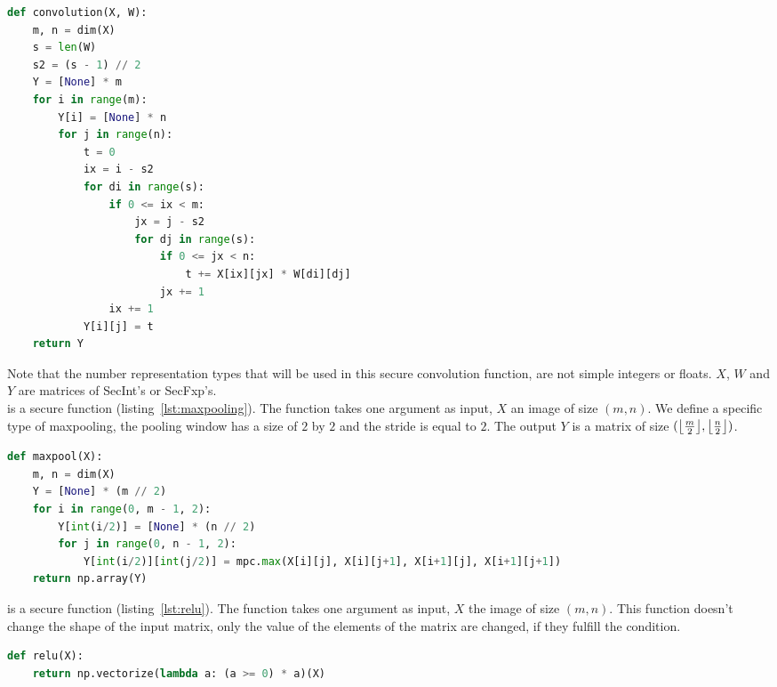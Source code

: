 \begin{lstlisting}[language=Python, caption={Secure convolution function}, label={lst:convolution}, frame=single, breaklines=true]
def convolution(X, W):
    m, n = dim(X)
    s = len(W)
    s2 = (s - 1) // 2
    Y = [None] * m
    for i in range(m):
        Y[i] = [None] * n
        for j in range(n):
            t = 0
            ix = i - s2
            for di in range(s):
                if 0 <= ix < m:
                    jx = j - s2
                    for dj in range(s):
                        if 0 <= jx < n:
                            t += X[ix][jx] * W[di][dj]
                        jx += 1
                ix += 1
            Y[i][j] = t
    return Y
\end{lstlisting}

Note that the number representation types that will be used in this secure convolution function, are not simple integers or floats. $X$, $W$ and $Y$ are matrices of SecInt's or SecFxp's.\\

 is a secure function (listing~\ref{lst:maxpooling}). The function takes one argument as input, $X$ an image of size $(m,n)$. We define a specific type of maxpooling, the pooling window has a size of $2$ by $2$ and the stride is equal to $2$. The output $Y$ is a matrix of size $(\floor*{\frac{m}{2}}, \floor*{\frac{n}{2}})$.

\begin{lstlisting}[language=Python, caption={Secure maxpooling function}, label={lst:maxpooling}, frame=single, breaklines=true]
def maxpool(X):
    m, n = dim(X)
    Y = [None] * (m // 2)
    for i in range(0, m - 1, 2):
        Y[int(i/2)] = [None] * (n // 2)
        for j in range(0, n - 1, 2):
            Y[int(i/2)][int(j/2)] = mpc.max(X[i][j], X[i][j+1], X[i+1][j], X[i+1][j+1])
    return np.array(Y)
\end{lstlisting}

 is a secure function (listing~\ref{lst:relu}). The function takes one argument as input, $X$ the image of size $(m,n)$. This function doesn't change the shape of the input matrix, only the value of the elements of the matrix are changed, if they fulfill the condition.

\begin{lstlisting}[language=Python, caption={Secure ReLU function}, label={lst:relu}, frame=single, breaklines=true]
def relu(X):
    return np.vectorize(lambda a: (a >= 0) * a)(X)
\end{lstlisting}


